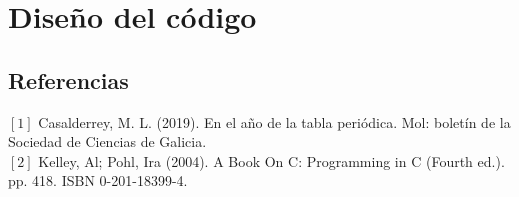 \documentclass[12pt]{article}
\begin{document}
	\section{Diseño del código} 
		
	\begin{multicols}{2} 
		\section{Referencias} 
			$[1]$ Casalderrey, M. L. (2019). En el año de la tabla periódica. Mol: boletín de la Sociedad de Ciencias de Galicia.\\
			$[2]$ Kelley, Al; Pohl, Ira (2004). A Book On C: Programming in C (Fourth ed.). pp. 418. ISBN 0-201-18399-4.\\
	\end{multicols} 
\end{document}

